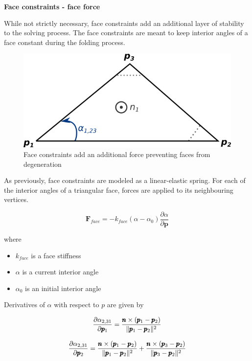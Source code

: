 \medskip
\textbf{Face constraints - face force}
\smallskip

While not strictly necessary, face constraints add an additional layer of stability to the 
solving process. The face constraints are meant to keep interior angles of a face
constant during the folding process.

\begin{figure}[H]
	\caption{Face constraints add an additional force preventing faces from degeneration}
    \centering
	\includegraphics[width=.6\linewidth]{assets/3-face_force_face.png}
\end{figure}

As previously, face constraints are modeled as a linear-elastic spring.
For each of the interior angles of a triangular face, forces are applied to its neighbouring vertices.

\begin{equation} \label{Solver:face_force}
	\pmb{F}_{face} = -k_{face}(\alpha - \alpha _0)\frac{\partial \alpha}{\partial \pmb{p}}
\end{equation}

where

\begin{itemize}
	\item $k_{face}$ is a face stiffness
	\item $\alpha$ is a current interior angle
	\item $\alpha _0$ is an initial interior angle
\end{itemize}

Derivatives of $\alpha$ with respect to $p$ are given by

\begin{equation} \label{Solver:face_force1}
	\frac{\partial \alpha _{2,31}}{\partial \pmb{p}_1} = \frac{\pmb{n} \times (\pmb{p}_1 - \pmb{p}_2)}{\|\pmb{p}_1 - \pmb{p}_2\|^2}
\end{equation}

\begin{equation} \label{Solver:face_force2}
	\frac{\partial \alpha _{2,31}}{\partial \pmb{p}_2} = \frac{\pmb{n} \times (\pmb{p}_1 - \pmb{p}_2)}{\|\pmb{p}_1 - \pmb{p}_2\|^2} + \frac{\pmb{n} \times (\pmb{p}_3 - \pmb{p}_2)}{\|\pmb{p}_3 - \pmb{p}_2\|^2}
\end{equation}

